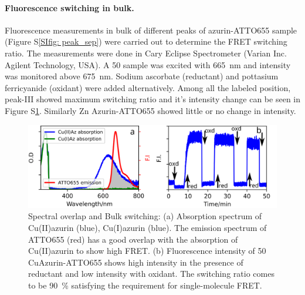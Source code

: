 \paragraph*{Fluorescence switching in bulk.} Fluorescence measurements in bulk of different peaks of azurin-ATTO655 sample (Figure S\ref{SIfig: peak_sep}) were carried out to determine the FRET switching ratio.
The measurements were done in Cary Eclipse Spectrometer (Varian Inc. Agilent Technology, USA).
A \SI{50}{\nM} sample was excited with \SI{665}{\nm} and intensity was monitored above \SI{675}{\nm}.
Sodium ascorbate (reductant) and pottasium ferricyanide (oxidant) were added alternatively.
Among all the labeled position, peak-III showed maximum switching ratio and it's intensity change can be seen in Figure S\ref{SIfig: switching}.
Similarly Zn Azurin-ATTO655 showed little or no change in intensity.
\squeezeup
\begin{figure}
  \centering
  \includegraphics[width=\textwidth]{spectral_overlap_switching}
  \makeatletter
  \renewcommand{\fnum@figure}{\figurename~S\thefigure}
  \makeatother
  \caption{Spectral overlap and Bulk switching: (a) Absorption spectrum of Cu(II)azurin (blue), Cu(I)azurin (blue).
  The emission spectrum of ATTO655 (red) has a good overlap with the absorption of Cu(II)azurin to show high FRET. 
  (b) Fluorescence intensity of \SI{50}{\nM} CuAzurin-ATTO655 shows high intensity in the presence of reductant and low 
  intensity with oxidant.
  The switching ratio comes to be \SI{90}{\percent} satisfying the requirement for single-molecule FRET.}
  \label{SIfig: switching}
\end{figure}

